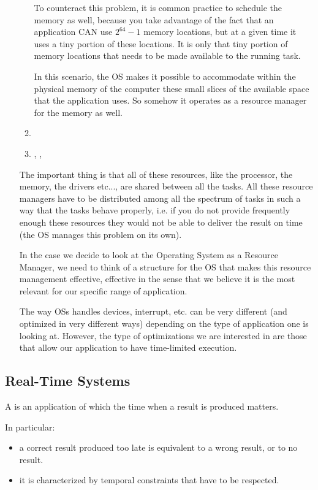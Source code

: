 \begin{itemize}
\begin{enumerate}
        To counteract this problem, it is common practice to schedule the memory as well, because you take advantage of the fact that an application CAN use $2^{64} - 1$ memory locations, but at a given time it uses a tiny portion of these locations. It is only that tiny portion of memory locations that needs to be made available to the running task.
        
        In this scenario, the OS makes it possible to accommodate within the physical memory of the computer these small slices of the available space that the application uses. So somehow it operates as a resource manager for the memory as well.
        \item {}
        \item {}, , 
        \end{enumerate}
        The important thing is that all of these resources, like the processor, the memory, the drivers etc..., are shared between all the tasks.
        All these resource managers have to be distributed among all the spectrum of tasks in such a way that the tasks behave properly, i.e. if you do not provide frequently enough these resources they would not be able to deliver the result on time (the OS manages this problem on its own).
        
        In the case we decide to look at the Operating System as a Resource Manager, we need to think of a structure for the OS that makes this resource management effective, effective in the sense that we believe it is the most relevant for our specific range of application.
        
        The way OSs handles devices, interrupt, etc. can be very different (and optimized in very different ways) depending on the type of application one is looking at. However, the type of optimizations we are interested in are those that allow our application to have time-limited execution.
\end{itemize}



\subsection*{Real-Time Systems}
A  is an application of which the time when a result is produced matters.

In particular:
\begin{itemize}
\item a correct result produced too late is equivalent to a wrong result, or to no result.
\item it is characterized by temporal constraints that have to be respected.
\end{itemize}

